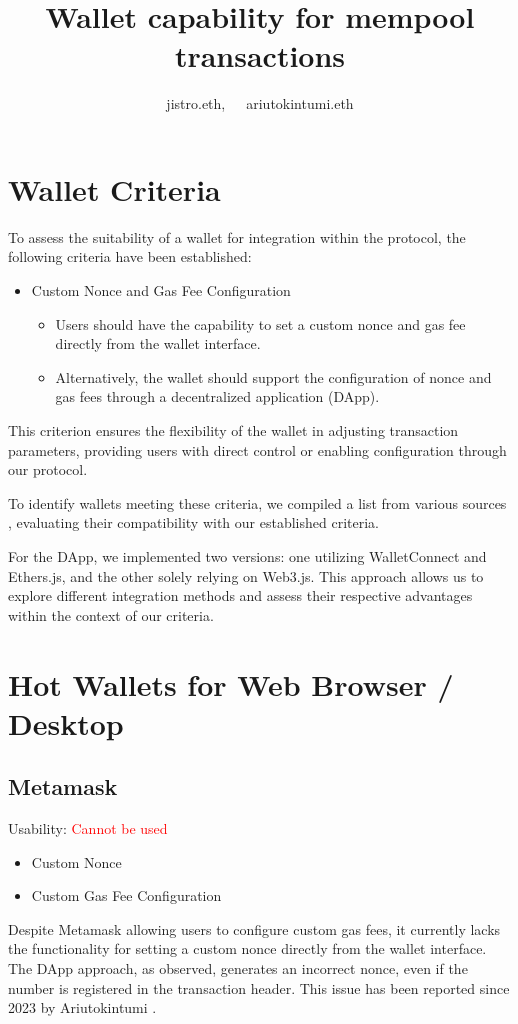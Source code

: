 \documentclass[fleqn,10pt]{olplainarticle}
\title{Wallet capability for mempool transactions}
\author[1]{jistro.eth,~~~ariutokintumi.eth}
\newcommand{\cmark}{\ding{51}}%
\newcommand{\xmark}{\ding{55}}%
\begin{document}
\flushbottom
\maketitle
\thispagestyle{empty}

\tableofcontents

\section{Wallet Criteria}

To assess the suitability of a wallet for integration within the protocol, the following criteria have been established:

\begin{itemize}[noitemsep]
	\item Custom Nonce and Gas Fee Configuration
	\begin{itemize}[noitemsep, nolistsep]
		\item Users should have the capability to set a custom nonce and gas fee directly from the wallet interface.
		\item Alternatively, the wallet should support the configuration of nonce and gas fees through a decentralized application (DApp).
	\end{itemize}
\end{itemize}

This criterion ensures the flexibility of the wallet in adjusting transaction parameters, providing users with direct control or enabling configuration through our protocol.

To identify wallets meeting these criteria, we compiled a list from various sources \cite{walletconnect_explorer_nodate}, evaluating their compatibility with our established criteria.

For the DApp, we implemented two versions: one utilizing WalletConnect and Ethers.js, and the other solely relying on Web3.js. This approach allows us to explore different integration methods and assess their respective advantages within the context of our criteria.


\section{Hot Wallets for Web Browser / Desktop}

\subsection{Metamask}
Usability: \textcolor{red}{Cannot be used}
\begin{itemize}[noitemsep, nolistsep]
	\item [\textcolor{red}{\xmark}] Custom Nonce
	\item [\textcolor{green}{\cmark}] Custom Gas Fee Configuration
\end{itemize}
Despite Metamask allowing users to configure custom gas fees, it currently lacks the functionality for setting a custom nonce directly from the wallet interface. The DApp approach, as observed, generates an incorrect nonce, even if the number is registered in the transaction header. This issue has been reported since 2023 by Ariutokintumi \cite{ariutokintumi_BugReceived_2023}.
\end{document}
